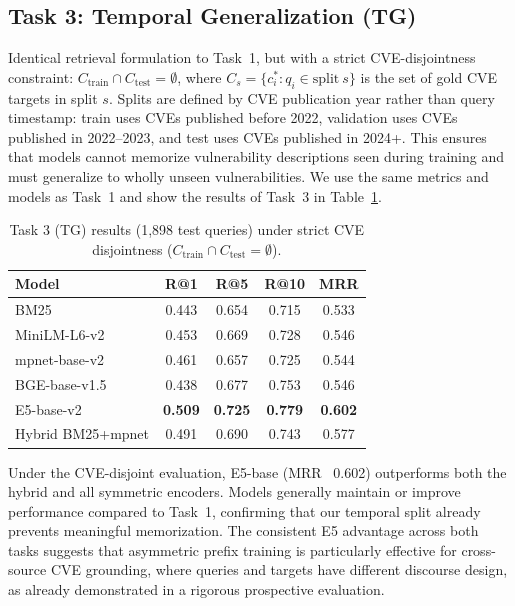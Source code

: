 \documentclass{article}
\begin{document}
\subsection{Task 3: Temporal Generalization (TG)}
\label{sec:task3}

Identical retrieval formulation to Task~1, but with a strict CVE-disjointness constraint: $C_{\text{train}} \cap C_{\text{test}} = \emptyset$, where $C_s = \{c^*_i : q_i \in \text{split}~s\}$ is the set of gold CVE targets in split $s$. Splits are defined by CVE publication year rather than query timestamp: train uses CVEs published before 2022, validation uses CVEs published in 2022--2023, and test uses CVEs published in 2024+. This ensures that models cannot memorize vulnerability descriptions seen during training and must generalize to wholly unseen vulnerabilities. We use the same metrics and models as Task~1 and show the results of Task~3 in Table~\ref{tab:task3-results}.

\begin{table}
\vspace{-4pt}
\centering
\small
\setlength{\tabcolsep}{3pt}
\caption{Task 3 (TG) results (1,898 test queries) under strict CVE disjointness
($C_{\text{train}} \cap C_{\text{test}} = \emptyset$).}
\label{tab:task3-results}
\begin{tabular}{lcccc}
\toprule
\textbf{Model} & \textbf{R@1} & \textbf{R@5} & \textbf{R@10} & \textbf{MRR} \\
\midrule
BM25 & 0.443 & 0.654 & 0.715 & 0.533 \\
MiniLM-L6-v2 & 0.453 & 0.669 & 0.728 & 0.546 \\
mpnet-base-v2 & 0.461 & 0.657 & 0.725 & 0.544 \\
BGE-base-v1.5 & 0.438 & 0.677 & 0.753 & 0.546 \\
E5-base-v2 & \textbf{0.509} & \textbf{0.725} & \textbf{0.779} & \textbf{0.602} \\
\midrule
Hybrid BM25+mpnet & 0.491 & 0.690 & 0.743 & 0.577 \\
\bottomrule
\end{tabular}
\vspace{-4pt}
\end{table}

Under the CVE-disjoint evaluation, E5-base (MRR ~0.602) outperforms both the hybrid and all symmetric encoders. Models generally maintain or improve performance compared to Task~1, confirming that our temporal split already prevents meaningful memorization. The consistent E5 advantage across both tasks suggests that asymmetric prefix training is particularly effective for cross-source CVE grounding, where queries and targets have different discourse design, as already demonstrated in a rigorous prospective evaluation.
\end{document}
